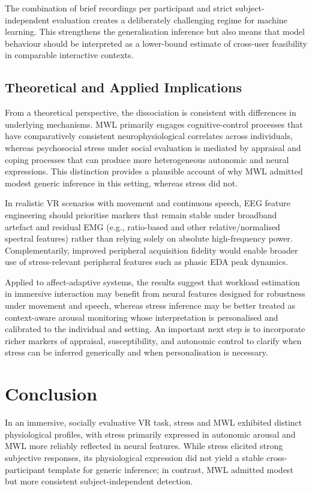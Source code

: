 \documentclass[lettersize,journal]{IEEEtran}
\begin{document}
The combination of brief recordings per participant and strict subject-independent evaluation creates a deliberately challenging regime for machine learning. This strengthens the generalisation inference but also means that model behaviour should be interpreted as a lower-bound estimate of cross-user feasibility in comparable interactive contexts.


\subsection{Theoretical and Applied Implications}
From a theoretical perspective, the dissociation is consistent with differences in underlying mechanisms. MWL primarily engages cognitive-control processes that have comparatively consistent neurophysiological correlates across individuals, whereas psychosocial stress under social evaluation is mediated by appraisal and coping processes that can produce more heterogeneous autonomic and neural expressions. This distinction provides a plausible account of why MWL admitted modest generic inference in this setting, whereas stress did not.

In realistic VR scenarios with movement and continuous speech, EEG feature engineering should prioritise markers that remain stable under broadband artefact and residual EMG (e.g., ratio-based and other relative/normalised spectral features) rather than relying solely on absolute high-frequency power. Complementarily, improved peripheral acquisition fidelity would enable broader use of stress-relevant peripheral features such as phasic EDA peak dynamics.

Applied to affect-adaptive systems, the results suggest that workload estimation in immersive interaction may benefit from neural features designed for robustness under movement and speech, whereas stress inference may be better treated as context-aware arousal monitoring whose interpretation is personalised and calibrated to the individual and setting. An important next step is to incorporate richer markers of appraisal, susceptibility, and autonomic control to clarify when stress can be inferred generically and when personalisation is necessary.


\section{Conclusion}
In an immersive, socially evaluative VR task, stress and MWL exhibited distinct physiological profiles, with stress primarily expressed in autonomic arousal and MWL more reliably reflected in neural features. While stress elicited strong subjective responses, its physiological expression did not yield a stable cross-participant template for generic inference; in contrast, MWL admitted modest but more consistent subject-independent detection. 
\end{document}
